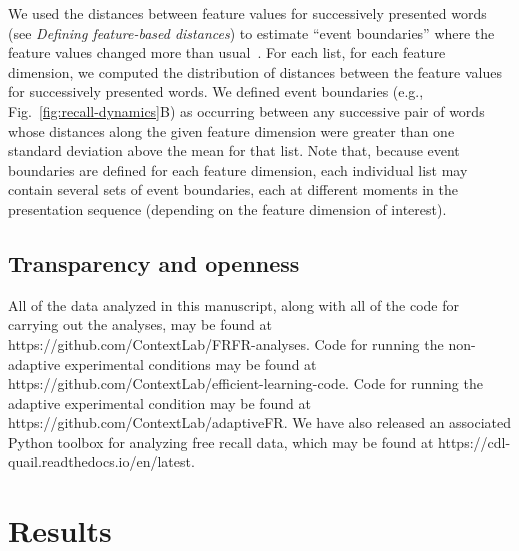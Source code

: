 \documentclass[11pt]{article}
\begin{document}
We used the distances between feature values for successively presented words
(see \textit{Defining feature-based distances}) to estimate ``event
boundaries'' where the feature values changed more than
usual~\citep{EzzyDava11, MannEtal16,RadvCope06, SwalEtal09, SwalEtal11,
DuBrDava16}. For each list, for each feature dimension, we computed the
distribution of distances between the feature values for successively presented
words. We defined event boundaries (e.g., Fig.~\ref{fig:recall-dynamics}B) as
occurring between any successive pair of words whose distances along the given
feature dimension were greater than one standard deviation above the mean for
that list. Note that, because event boundaries are defined for each feature
dimension, each individual list may contain several sets of event boundaries,
each at different moments in the presentation sequence (depending on the
feature dimension of interest).

\subsection*{Transparency and openness}

All of the data analyzed in this manuscript, along with all of the code for
carrying out the analyses, may be found at https://github.com/ContextLab/FRFR-analyses.
Code for running the non-adaptive
experimental conditions may be found at
https://github.com/Con\-text\-Lab/efficient-learning-code. Code for running the
adaptive experimental condition may be found at
https://github.com/ContextLab/adaptiveFR. We have also released an associated
Python toolbox for analyzing free recall data, which may be found at
https://cdl-quail.read\-the\-docs.io/\-en/\-latest.

\section*{Results}
\end{document}

